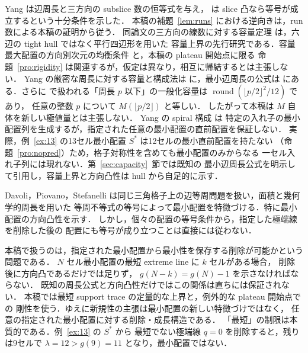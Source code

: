 \documentclass[11pt]{article}
\theoremstyle{plain}
\theoremstyle{definition}
\theoremstyle{remark}
\begin{document}
Yang \cite[Theorem~4]{Yang2002} は辺周長と三方向の subslice 数の恒等式を与え，
\cite[Theorem~5]{Yang2002} は slice 凸なら等号が成立するという十分条件を示した．
本稿の補題~\ref{lem:runs} における逆向きは，run 数による本稿の証明から従う．
同論文の三方向の線数に対する容量定理
\cite[Theorem~7]{Yang2002} は，六辺の tight hull ではなく平行四辺形を用いた
容量上界の先行研究である．容量最大配置の方向別次元の均衡条件
\cite[Theorem~9]{Yang2002} と，本稿の plateau 開始点に限る
命題~\ref{pro:rigidity} は関連するが，仮定は異なり，相互に帰結するとは主張しない．
Yang の厳密な周長に対する容量と構成法は
\cite[Theorems~8 and 11]{Yang2002} に，最小辺周長の公式は
\cite[Theorem~18]{Yang2002} にある．さらに
\cite[Section~10]{Yang2002} で扱われる「周長 \(p\) 以下」の一般化容量は
\(\operatorname{round}(\lfloor p/2\rfloor^2/12)\) であり，
任意の整数 \(p\) について \(M(\lfloor p/2\rfloor)\) と等しい．
したがって本稿は \(M\) 自体を新しい極値量とは主張しない．
Yang の spiral 構成 \cite[Theorems~13--14]{Yang2002} は
特定の入れ子の最小配置列を生成するが，指定された任意の最小配置の直前配置を保証しない．
実際，例~\ref{ex:13} の13セル最小配置 \(S^\ast\) は12セルの最小直前配置を持たない
（命題~\ref{pro:nopred}）ため，格子対称性を含めても最小配置のみからなる
一セル入れ子列には現れない．第~\ref{sec:capacity}~節では既知の
最小辺周長公式を明示して引用し，容量上界と方向凸性は hull から自足的に示す．

Davoli，Piovano，Stefanelli \cite[Theorem~1.1]{DavoliPiovanoStefanelli2017}
は同じ三角格子上の辺等周問題を扱い，面積と幾何学的周長を用いた
等周不等式の等号によって最小配置を特徴づける．特に最小配置の方向凸性を示す．
しかし，個々の配置の等号条件から，指定した極端線を削除した後の
配置にも等号が成り立つことは直接には従わない．

本稿で扱うのは，指定された最小配置から最小性を保存する削除が可能かという問題である．
\(N\) セル最小配置の最短 extreme line に \(k\) セルがある場合，
削除後に方向凸であるだけでは足りず，
\(g(N-k)=g(N)-1\) を示さなければならない．
既知の周長公式と方向凸性だけではこの関係は直ちには保証されない．
本稿では最短 support trace の定量的な上界と，例外的な plateau 開始点での
剛性を使う．ゆえに新規性の主張は最小配置の新しい特徴づけではなく，
任意の指定された最小配置に対する削除・成長構造である．
「最短」の制限は本質的である．例~\ref{ex:13} の \(S^\ast\) から
最短でない極端線 \(q=0\) を削除すると，残りは9セルで
\(\lambda=12>g(9)=11\) となり，最小配置ではない．
\end{document}

